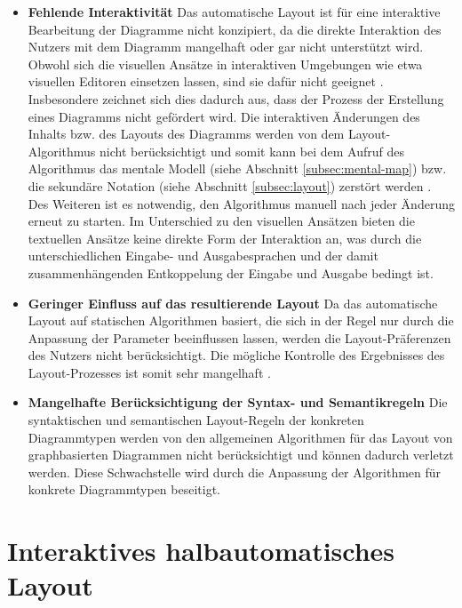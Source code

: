 \begin{itemize}

\item
\textbf{Fehlende Interaktivität}
Das automatische Layout ist für eine interaktive Bearbeitung der Diagramme nicht konzipiert, da die direkte Interaktion des Nutzers mit dem Diagramm mangelhaft oder gar nicht unterstützt wird. Obwohl sich die visuellen Ansätze in interaktiven Umgebungen wie etwa visuellen Editoren einsetzen lassen, sind sie dafür nicht geeignet \cite[S.22ff]{Maier12A-Pattern-based} \cite[S.4]{DwyerMarriott08Interactive}. Insbesondere zeichnet sich dies dadurch aus, dass der Prozess der Erstellung eines Diagramms nicht gefördert wird. Die interaktiven Änderungen des Inhalts bzw. des Layouts des Diagramms werden von dem Layout-Algorithmus nicht berücksichtigt und somit kann bei dem Aufruf des Algorithmus das mentale Modell (siehe Abschnitt \ref{subsec:mental-map}) bzw. die sekundäre Notation (siehe Abschnitt \ref{subsec:layout}) zerstört werden \cite{Eiglsperger04Automatic}. Des Weiteren ist es notwendig, den Algorithmus manuell nach jeder Änderung erneut zu starten. Im Unterschied zu den visuellen Ansätzen bieten die textuellen Ansätze keine direkte Form der Interaktion an, was durch die unterschiedlichen Eingabe- und Ausgabesprachen und der damit zusammenhängenden Entkoppelung der Eingabe und Ausgabe bedingt ist.

\item
\textbf{Geringer Einfluss auf das resultierende Layout}
Da das automatische Layout auf statischen Algorithmen basiert, die sich in der Regel nur durch die Anpassung der Parameter beeinflussen lassen, werden die Layout-Präferenzen des Nutzers nicht berücksichtigt. Die mögliche Kontrolle des Ergebnisses des Layout-Prozesses ist somit sehr mangelhaft \cite{GladischSchumann14Semi-Automatic}.

\item
\textbf{Mangelhafte Berücksichtigung der Syntax- und Semantikregeln}
Die syntaktischen und semantischen Layout-Regeln der konkreten Diagrammtypen werden von den allgemeinen Algorithmen für das Layout von graphbasierten Diagrammen nicht berücksichtigt und können dadurch verletzt werden. Diese Schwachstelle wird durch die Anpassung der Algorithmen für konkrete Diagrammtypen beseitigt.

\end{itemize}

\section{Interaktives halbautomatisches Layout}
\label{sec:interactive-semi-automatic-layout}


